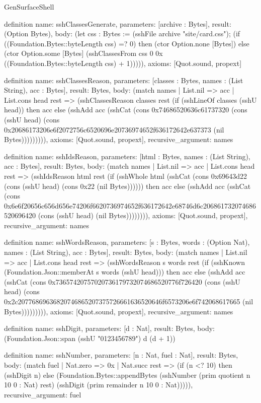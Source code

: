 \begin{lexlean}{GenSurfaceShell}
\begin{semanticmodule}
definition{
  name: sshClassesGenerate,
  parameters: [archive : Bytes],
  result: (Option Bytes),
  body: (let css : Bytes := (sshFile archive "site/card.css"); (if ((Foundation.Bytes::byteLength css) =? 0) then (ctor Option.none [Bytes]) else (ctor Option.some [Bytes] (sshClassesFrom css 0 0x ((Foundation.Bytes::byteLength css) + 1))))),
  axioms: [Quot.sound, propext]
}

definition{
  name: sshClassesReason,
  parameters: [classes : Bytes, names : (List String), acc : Bytes],
  result: Bytes,
  body: (match names
    | List.nil => acc
    | List.cons head rest => (sshClassesReason classes rest (if (sshLineOf classes (sshU head)) then acc else (sshAdd acc (sshCat (cons 0x74686520636c61737320 (cons (sshU head) (cons 0x20686173206e6f2072756c6520696e20736974652f636172642e637373 (nil Bytes))))))))),
  axioms: [Quot.sound, propext],
  recursive_argument: names
}

definition{
  name: sshIdsReason,
  parameters: [html : Bytes, names : (List String), acc : Bytes],
  result: Bytes,
  body: (match names
    | List.nil => acc
    | List.cons head rest => (sshIdsReason html rest (if (sshWhole html (sshCat (cons 0x69643d22 (cons (sshU head) (cons 0x22 (nil Bytes)))))) then acc else (sshAdd acc (sshCat (cons 0x6e6f20656c656d656e74206f6620736974652f636172642e68746d6c206861732074686520696420 (cons (sshU head) (nil Bytes)))))))),
  axioms: [Quot.sound, propext],
  recursive_argument: names
}

definition{
  name: sshWordsReason,
  parameters: [s : Bytes, words : (Option Nat), names : (List String), acc : Bytes],
  result: Bytes,
  body: (match names
    | List.nil => acc
    | List.cons head rest => (sshWordsReason s words rest (if (sshKnown (Foundation.Json::memberAt s words (sshU head))) then acc else (sshAdd acc (sshCat (cons 0x73657420757020736179732074686520776f726420 (cons (sshU head) (cons 0x2c20776869636820746865207375726661636520646f6573206e6f742068617665 (nil Bytes))))))))),
  axioms: [Quot.sound, propext],
  recursive_argument: names
}

definition{
  name: sshDigit,
  parameters: [d : Nat],
  result: Bytes,
  body: (Foundation.Json::span (sshU "0123456789") d (d + 1))
}

definition{
  name: sshNumber,
  parameters: [n : Nat, fuel : Nat],
  result: Bytes,
  body: (match fuel
    | Nat.zero => 0x
    | Nat.succ rest => (if (n <? 10) then (sshDigit n) else (Foundation.Bytes::appendBytes (sshNumber (prim quotient n 10 0 : Nat) rest) (sshDigit (prim remainder n 10 0 : Nat))))),
  recursive_argument: fuel
}


\end{semanticmodule}
\end{lexlean}
